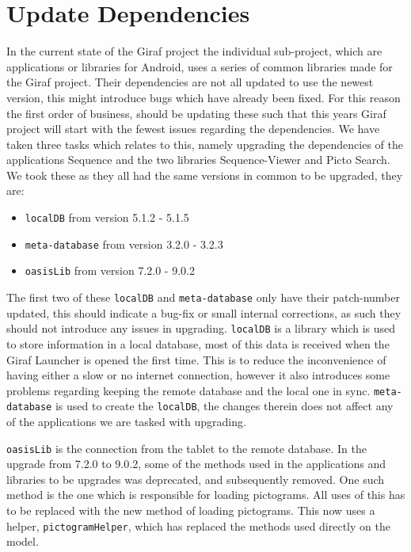 \section{Update Dependencies} 
In the current state of the Giraf project the individual sub-project, which are applications or libraries for Android, uses a series of common libraries made for the Giraf project. 
Their dependencies are not all updated to use the newest version, this might introduce bugs which have already been fixed. 
For this reason the first order of business, should be updating these such that this years Giraf project will start with the fewest issues regarding the dependencies. 
 We have taken three tasks which relates to this, namely upgrading the dependencies of the applications Sequence and the two libraries Sequence-Viewer and Picto Search. 
We took these as they all had the same versions in common to be upgraded, they are: 
\begin{itemize} 
    \item \texttt{localDB} from version 5.1.2 - 5.1.5 
    \item \texttt{meta-database} from version 3.2.0 - 3.2.3 
    \item \texttt{oasisLib} from version 7.2.0 - 9.0.2 
\end{itemize} 
The first two of these \texttt{localDB} and \texttt{meta-database} only have their patch-number updated, this should indicate a bug-fix or small internal corrections, as such they should not introduce any issues in upgrading. 
 \texttt{localDB} is a library which is used to store information in a local database, most of this data is received when the Giraf Launcher is opened the first time. 
 This is to reduce the inconvenience of having either a slow or no internet connection, however it also introduces some problems regarding keeping the remote database and the local one in sync. 
 \texttt{meta-database} is used to create the \texttt{localDB}, the changes therein does not affect any of the applications we are tasked with upgrading. 
  
\texttt{oasisLib} is the connection from the tablet to the remote database. 
In the upgrade from 7.2.0 to 9.0.2, some of the methods used in the applications and libraries to be upgrades was deprecated, and subsequently removed. 
 One such method is the one which is responsible for loading pictograms. 
All uses of this has to be replaced with the new method of loading pictograms. 
 This now uses a helper, \texttt{pictogramHelper}, which has replaced the methods used directly on the model. 
  
